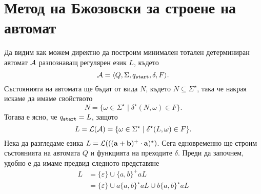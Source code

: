 \section{Метод на Бжозовски за строене на автомат}


Да видим как можем директно да построим минимален тотален детерминиран автомат $\mathcal{A}$
разпознаващ регулярен език $L$, където \[\mathcal{A} = \langle{Q,\Sigma,q_{\texttt{start}},\delta,F}\rangle.\]
Състоянията на автомата ще бъдат от вида $N$, където $N \subseteq \Sigma^\star$, така че накрая искаме да имаме свойството
\[N = \{\omega \in \Sigma^\star \mid \delta^\star(N,\omega) \in F\}.\]
Тогава е ясно, че $q_{\texttt{start}} = L$, защото 
\[L = \mathcal{L}(\mathcal{A}) = \{\omega \in \Sigma^\star \mid \delta^\star(L,\omega) \in F\}.\]
Нека да разгледаме езика $L = \mathcal{L}(\mathbf{((a+b)^+\cdot a)^\star})$.
Сега едновременно ще строим състоянията на автомата $Q$ и функцията на преходите $\delta$.
Преди да започнем, удобно е да имаме предвид следното представяне
\begin{align*}
  L & = \{\varepsilon\} \cup \{a,b\}^+ a L\\
  & = \{\varepsilon\} \cup a\{a,b\}^\star aL \cup b\{a,b\}^\star aL
\end{align*}

